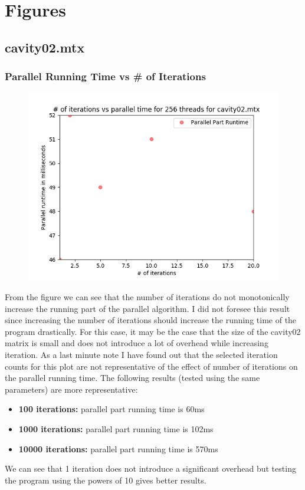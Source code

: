 \documentclass{article}
\begin{document}
\section{Figures}
\subsection{cavity02.mtx}
\subsubsection{Parallel Running Time vs # of Iterations}

\begin{figure}[H]
\centering
\includegraphics[width=\linewidth]{assets/cavity_iter_parallel.png}
\label{fig:test1}
\vspace{-2pt}
\end{figure}

\null \qquad From the figure we can see that the number of iterations do not monotonically increase the running part of the parallel algorithm. I did not foresee this result since increasing the number of iterations should increase the running time of the program drastically. For this case, it may be the case that the size of the cavity02 matrix is small and does not introduce a lot of overhead while increasing iteration. As a last minute note I have found out that the selected iteration counts for this plot are not representative of the effect of number of iterations on the parallel running time. The following results (tested using the same parameters) are more representative:
\begin{itemize}
    \item \textbf{100 iterations:} parallel part running  time is 60ms
    \item \textbf{1000 iterations:} parallel part running  time is 102ms
    \item \textbf{10000 iterations:} parallel part running  time is 570ms
\end{itemize}
We can see that 1 iteration does not introduce a significant overhead but testing the program using the powers of 10 gives better results.
\end{document}
